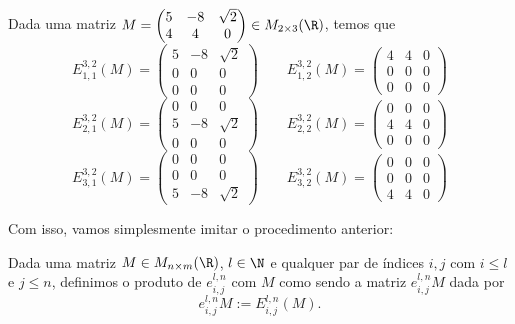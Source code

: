 \begin{ex}
	Dada uma matriz $M=\begin{pmatrix}
	5 & -8 & \sqrt 2\\
	4 & 4 & 0
	\end{pmatrix}\in M_{2\times 3}(\R)$, temos que
	\[E^{3,2}_{1,1}(M)=\begin{pmatrix}
	5 & -8 & \sqrt2\\
	0&0&0\\
	0&0&0
	\end{pmatrix}\quad\quad E^{3,2}_{1,2}(M)=\begin{pmatrix}
	4 & 4&0\\
	0&0&0\\
	0&0&0
	\end{pmatrix}\]
	\[E^{3,2}_{2,1}(M)=\begin{pmatrix}
	0&0&0\\
	5 & -8 & \sqrt2\\	
	0&0&0
	\end{pmatrix}\quad\quad E^{3,2}_{2,2}(M)=\begin{pmatrix}
	0&0&0\\
	4 & 4 & 0\\	
	0&0&0
	\end{pmatrix}\]
	\[E^{3,2}_{3,1}(M)=\begin{pmatrix}
	0&0&0\\
	0&0 & 0\\	
	5 & -8 & \sqrt2
	\end{pmatrix}\quad\quad E^{3,2}_{3,2}(M)=\begin{pmatrix}
	0&0&0\\
	0&0&0\\	
	4 & 4 & 0
	\end{pmatrix}\]
\end{ex}

Com isso, vamos simplesmente imitar o procedimento anterior:
\begin{df}
	Dada uma matriz $M\in M_{n\times m}(\R)$, $l\in \N$ e qualquer par de índices $i,j$ com $i\leq l$ e $j\leq n$, definimos o produto de $e^{l,n}_{i,j}$ com $M$ como sendo a matriz $e^{l,n}_{i,j}M$ dada por
	\[e^{l,n}_{i,j}M:=E^{l,n}_{i,j}(M).\]
\end{df}

